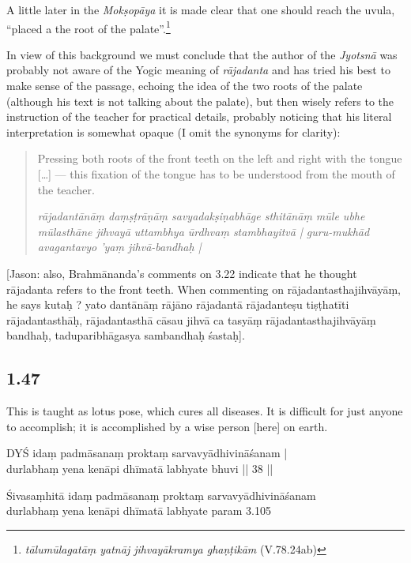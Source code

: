 \begin{ekdosis}
\begin{philcomm}[hp01_045]
A little later in the \emph{Mokṣopāya} it is made clear that one should reach the uvula, ``placed a
the root of the palate''.\footnote{\emph{tālumūlagatāṃ yatnāj jihvayākramya ghaṇṭikām}
(V.78.24ab)}

In view of this background we must conclude that the author of the \emph{Jyotsnā} was probably not
aware of the Yogic meaning of \emph{rājadanta} and has tried his best to make sense of the passage,
echoing the idea of the two roots of the palate (although his text is not talking about the
palate), but then wisely refers to the instruction of the teacher for practical details, probably
noticing that his literal interpretation is somewhat opaque (I omit the synonyms for clarity):

\begin{quote}
Pressing both roots of the front teeth on the left and right with the tongue [\ldots] — this fixation of the tongue has to be understood from the mouth of the teacher.

\emph{rājadantānāṃ daṃṣṭrāṇāṃ savyadakṣiṇabhāge sthitānāṃ mūle ubhe mūlasthāne jihvayā uttambhya ūrdhvaṃ stambhayitvā | guru-mukhād avagantavyo 'yaṃ jihvā-bandhaḥ |}
\end{quote}

[Jason: also, Brahmānanda’s comments on 3.22 indicate that he thought rājadanta refers to the front teeth. When commenting on rājadantasthajihvāyāṃ, he says kutaḥ ? yato dantānāṃ rājāno rājadantā rājadanteṣu tiṣṭhatīti rājadantasthāḥ, rājadantasthā cāsau jihvā ca tasyāṃ rājadantasthajihvāyāṃ bandhaḥ, taduparibhāgasya sambandhaḥ śastaḥ].
\end{philcomm}

\subsection*{1.47}
\begin{translation}[hp01_047]
This is taught as lotus pose, which cures all diseases. It is difficult for just anyone to accomplish; it is accomplished by a wise person [here] on earth.
\end{translation}

\begin{sources}[hp01_047]
DYŚ
\startverse
idaṃ padmāsanaṃ proktaṃ sarvavyādhivināśanam |\\
durlabhaṃ yena kenāpi dhīmatā labhyate bhuvi || 38 ||
\endverse

Śivasaṃhitā
\startverse
idaṃ padmāsanaṃ proktaṃ sarvavyādhivināśanam\\
durlabhaṃ yena kenāpi dhīmatā labhyate param 3.105
\endverse
\end{sources}


\end{ekdosis}
